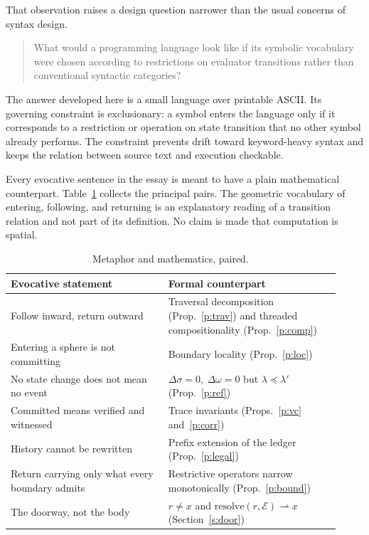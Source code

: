 \documentclass[11pt]{article}
\newcommand{\pre}{\preceq}
\begin{document}
That observation raises a design question narrower than the usual concerns of syntax design.

\begin{quote}
What would a programming language look like if its symbolic vocabulary were chosen according to restrictions on evaluator transitions rather than conventional syntactic categories?
\end{quote}

The answer developed here is a small language over printable ASCII. Its governing constraint is exclusionary: a symbol enters the language only if it corresponds to a restriction or operation on state transition that no other symbol already performs. The constraint prevents drift toward keyword-heavy syntax and keeps the relation between source text and execution checkable.

Every evocative sentence in the essay is meant to have a plain mathematical counterpart. Table~\ref{tab:pairs} collects the principal pairs. The geometric vocabulary of entering, following, and returning is an explanatory reading of a transition relation and not part of its definition. No claim is made that computation is spatial.

\begin{table}[h]
\centering
\small
\begin{tabular}{@{}p{0.44\linewidth}p{0.48\linewidth}@{}}
\toprule
Evocative statement & Formal counterpart \\
\midrule
Follow inward, return outward & Traversal decomposition (Prop.~\ref{p:trav}) and threaded compositionality (Prop.~\ref{p:comp}) \\
Entering a sphere is not committing & Boundary locality (Prop.~\ref{p:loc}) \\
No state change does not mean no event & $\Delta\sigma=0,\ \Delta\omega=0$ but $\lambda\pre\lambda'$ (Prop.~\ref{p:ref}) \\
Committed means verified and witnessed & Trace invariants (Props.~\ref{p:vc} and~\ref{p:corr}) \\
History cannot be rewritten & Prefix extension of the ledger (Prop.~\ref{p:legal}) \\
Return carrying only what every boundary admits & Restrictive operators narrow monotonically (Prop.~\ref{p:bound}) \\
The doorway, not the body & $r\neq x$ and $\mathrm{resolve}(r,\mathcal E)\rightharpoonup x$ (Section~\ref{s:door}) \\
\bottomrule
\end{tabular}
\caption{Metaphor and mathematics, paired.}
\label{tab:pairs}
\end{table}
\end{document}
